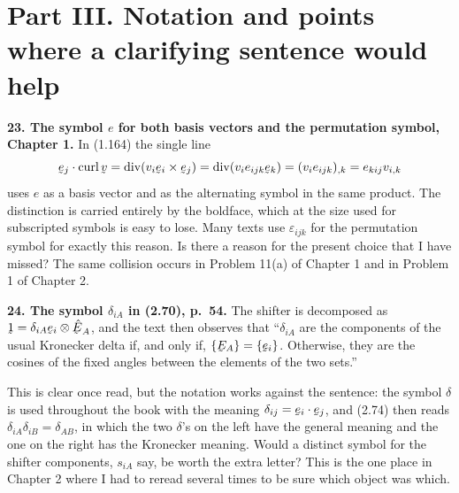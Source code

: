 \documentclass[12pt,a4paper]{article}
\DeclareRobustCommand{\vek}[1]{\underaccent{\tilde}{#1}}
\newcommand{\bv}{\vek{v}}
\newcommand{\bE}{\vek{E}}
\newcommand{\hbE}{\hat{\vek{E}}}
\newcommand{\be}{\vek{e}}
\newcommand{\dd}{\delta}
\newenvironment{query}[1]%
  {\par\medskip\noindent\textbf{#1}\quad}{\par\medskip}
\begin{document}
\section*{Part III. Notation and points where a clarifying sentence would help}

\begin{query}{23. The symbol $e$ for both basis vectors and the permutation
symbol, Chapter 1.}
In (1.164) the single line
\[
   \be_j\cdot\operatorname{curl}\bv=\operatorname{div}(v_i\be_i\times\be_j)
   =\operatorname{div}(v_i e_{ijk}\be_k)=(v_ie_{ijk})_{,k}=e_{kij}v_{i,k}
\]
uses $e$ as a basis vector and as the alternating symbol in the same
product. The distinction is carried entirely by the boldface, which at
the size used for subscripted symbols is easy to lose. Many texts use
$\varepsilon_{ijk}$ for the permutation symbol for exactly this reason.
Is there a reason for the present choice that I have missed? The same
collision occurs in Problem 11(a) of Chapter 1 and in Problem 1 of
Chapter 2.
\end{query}

\begin{query}{24. The symbol $\dd_{iA}$ in (2.70), p.~54.}
The shifter is decomposed as $\vek{1}=\dd_{iA}\be_i\otimes\hbE_A$, and the
text then observes that ``$\dd_{iA}$ are the components of the usual
Kronecker delta if, and only if, $\{\bE_A\}=\{\be_i\}$. Otherwise, they
are the cosines of the fixed angles between the elements of the two
sets.''

This is clear once read, but the notation works against the sentence: the
symbol $\dd$ is used throughout the book with the meaning
$\dd_{ij}=\be_i\cdot\be_j$, and (2.74) then reads
$\dd_{iA}\dd_{iB}=\dd_{AB}$, in which the two $\dd$'s on the left have the
general meaning and the one on the right has the Kronecker meaning. Would
a distinct symbol for the shifter components, $s_{iA}$ say, be worth the
extra letter? This is the one place in Chapter 2 where I had to reread
several times to be sure which object was which.
\end{query}
\end{document}
